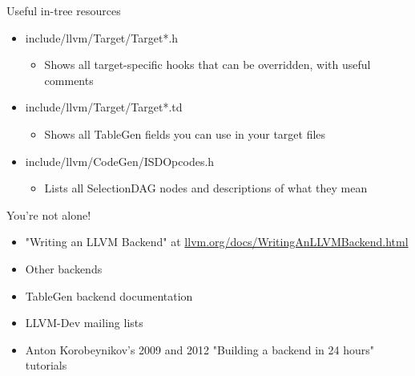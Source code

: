 \begin{frame}{Useful in-tree resources}

\begin{itemize}
    \item include/llvm/Target/Target*.h
    \begin{itemize}
        \item Shows all target-specific hooks that can be overridden, with useful comments
    \end{itemize}
    \item include/llvm/Target/Target*.td
    \begin{itemize}
        \item Shows all TableGen fields you can use in your target files
    \end{itemize}
    \item include/llvm/CodeGen/ISDOpcodes.h
    \begin{itemize}
        \item Lists all SelectionDAG nodes and descriptions of what they mean
    \end{itemize}
\end{itemize}

\end{frame}


\begin{frame}{You're not alone!}

\begin{itemize}
    \item "Writing an LLVM Backend" at \url{llvm.org/docs/WritingAnLLVMBackend.html}
    \item Other backends 
    \item TableGen backend documentation
    \item LLVM-Dev mailing lists
    \item Anton Korobeynikov's 2009 and 2012 "Building a backend in 24 hours" tutorials
\end{itemize}

\end{frame}
